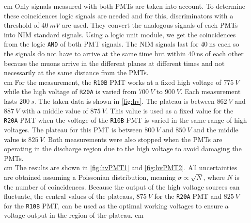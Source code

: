  cm
Only signals measured with both PMTs are taken into account. To determine these coincidences 
logic signals are needed and for this, discriminators with a threshold of $\SI{40}{mV}$ are used. 
They convert the analogous signals of each PMTs into NIM standard signals. Using a logic unit module, we get
the coincidences from the logic \texttt{AND} of both PMT signals. The NIM signals 
last for $\SI{40}{\ns}$ each so the signals do not have to arrive at the same time but within 
$\SI{40}{\ns}$ of each other because the muons arrive in the different planes at different times 
and not necessarily at the same distance from the PMTs.\\
 cm
For the measurement, the \texttt{R10B} PMT works at a fixed high voltage of $\SI{775}{V}$ while the high voltage of 
\texttt{R20A} is varied from $\SI{700}{V}$ to $\SI{900}{V}$. Each measurement lasts $\SI{200}{s}$.
The taken data is shown in \autoref{fig:hv}. The plateau is between $\SI{862}{V}$ 
and $\SI{887}{V}$ with a
middle value of $\SI{875}{V}$. This value is used as a fixed value for the \texttt{R20A} PMT when the voltage of the \texttt{R10B}
PMT is varied in the same range of high voltages. The plateau for this PMT is between $\SI{800}{V}$ and $\SI{850}{V}$
and the middle value is $\SI{825}{V}$.
Both measurements were also stopped when the PMTs are operating in the discharge region due to the high voltage to avoid damaging the PMTs.\\
 cm
The results are shown in \autoref{fig:hvPMT1} and \autoref{fig:hvPMT2}. All uncertainties are obtained 
assuming a Poissonian distribution, meaning $\sigma \propto \sqrt{N}$, where $N$ is the number of
coincidences. Because the output of the high voltage sources can fluctuate, the central values of the plateaus, $\SI{875}{V}$ for the \texttt{R20A} PMT and 
$\SI{825}{V}$ for the \texttt{R10B} PMT, can be used as the optimal working voltages to ensure
a voltage output in the region of the plateau.
 cm
